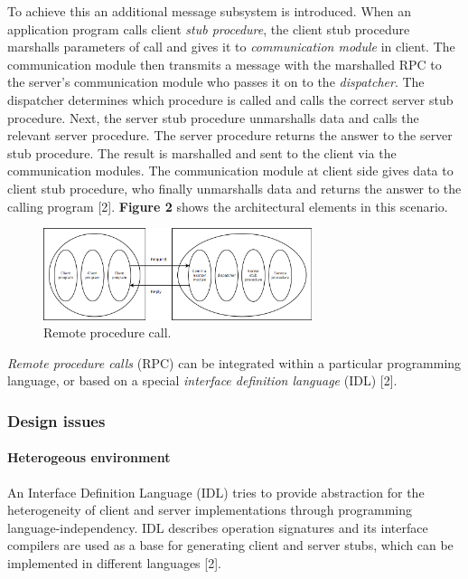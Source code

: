 To achieve this an additional message subsystem is introduced. When an application program calls client \emph{stub procedure}, the client stub procedure marshalls parameters of call and gives it to \emph{communication module} in client. The communication module then transmits a message with the marshalled RPC to the server's communication module who passes it on to the \emph{dispatcher}. The dispatcher determines which procedure is called and calls the correct server stub procedure. Next, the server stub procedure unmarshalls data and calls the relevant server procedure. The server procedure returns the answer to the server stub procedure. The result is marshalled and sent to the client via the communication modules. The communication module at client side gives data to client stub procedure, who finally unmarshalls data and returns the answer to the calling program [2]. \textbf{Figure 2} shows the architectural elements in this scenario.


\begin{figure}
	\begin{center}
		\includegraphics[width=0.7\textwidth]{img/rpc}
	\end{center}
	\caption{Remote procedure call.}
	\label{fig:rpc}
\end{figure}

\emph{Remote procedure calls} (RPC) can be integrated within a particular programming language, or based on a special \emph{interface definition language} (IDL) [2].


\subsubsection{Design issues}

\paragraph{Heterogeous environment}

An Interface Definition Language (IDL) tries to provide abstraction for the heterogeneity of client and server implementations through programming language-independency. IDL describes operation signatures and its interface compilers are used as a base for generating client and server stubs, which can be implemented in different languages [2].



